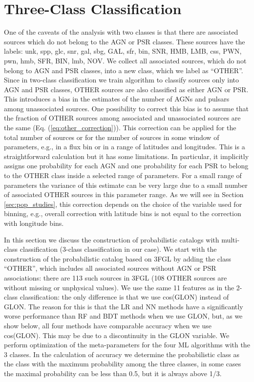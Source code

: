 \section{Three-Class Classification}

One of the caveats of the analysis with two classes is that there are associated sources which do not belong to the AGN or PSR classes. 
These sources have the labels: unk, spp, glc, snr, gal, sbg, GAL, sfr, bin, SNR, HMB, LMB, css, PWN, pwn, hmb, SFR, BIN, lmb, NOV.
We collect all associated sources, which do not belong to AGN and PSR classes, into a new class, which we label as ``OTHER''.
Since in two-class classification we train algorithm to classify sources only into AGN and PSR classes, OTHER sources are also classified as either AGN or PSR.
This introduces a bias in the estimates of the number of AGNs and pulsars among unassociated sources.
One possibility to correct this bias is to assume that the fraction of OTHER sources among associated and unassociated sources are the same (Eq. (\ref{eq:other_correction})).
This correction can be applied for the total number of sources or for the number of sources in some window of parameters,
e.g., in a flux bin or in a range of latitudes and longitudes.
This is a straightforward calculation but it has some limitations. 
In particular, it implicitly assigns one probability for each AGN and one probability for each PSR to belong to the OTHER class inside a selected range of parameters.
For a small range of parameters the variance of this estimate can be very large due to a small number of associated OTHER sources in this parameter range.
As we will see in Section \ref{sec:pop_studies}, this correction depends on the choice of the variable used for binning, e.g.,
overall correction with latitude bins is not equal to the correction with longitude bins.

In this section we discuss the construction of probabilistic catalogs with multi-class classification (3-class classification in our case).
We start with the construction of the probabilistic catalog based on 3FGL by adding the class ``OTHER'', which includes all associated sources without AGN or PSR associations: there are 113 such sources in 3FGL (108 OTHER sources are without missing or unphysical values).
We use the same 11 features as in the 2-class classification: the only difference is that we use cos(GLON) instead of GLON.
The reason for this is that the LR and NN methods have a significantly worse performance than RF and BDT methods when we use GLON,
but, as we show below, all four methods have comparable accuracy when we use cos(GLON).
This may be due to a discontinuity in the GLON variable. 
We perform optimization of the meta-parameters for the four ML algorithms with the 3 classes.
In the calculation of accuracy we determine the probabilistic class as the class with the maximum probability among the three classes,
in some cases the maximal probability can be less than 0.5, but it is always above 1/3.


